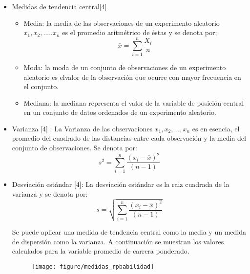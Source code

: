 \begin{itemize}
   
   \item Medidas de tendencia central[4] 
	   \begin{itemize}
		 	\item Media: la media de las observaciones de un experimento aleatorio $x_{1},x_{2},.....x_{n}$ es el promedio aritm\'etrico de \'estas y se denota por;
		 	$$\overline{x}=\sum_{i=1}^{n} \frac{X_{i}}{n}$$ 
		 	\item Moda: la moda de un conjunto de observaciones de un experimento aleatorio es elvalor de la observaci\'on que ocurre con mayor frecuencia en el conjunto.
		 	\item Mediana: la mediana representa el valor de la variable de posición central en un conjunto de datos ordenados de un experimento aleatorio.
		 \end{itemize}
		 
		 
		 \item Varianza [4] : La Varianza de las observaciones $x_{1},x_{2},...,x_{n}$ es en esencia, el promedio del cuadrado de las distancias entre cada observaci\'on y la media del conjunto de observaciones. Se denota por:
		 $$s^{2}=\sum_{i=1}^{n} \frac{ \left( x_{i}-\overline{x}\right)^{2}}{\left(n-1 \right) } $$ 
		 
		 
		 \item Desviación estándar [4]: La desviaci\'on est\'andar es la raiz cuadrada de la varianza y se denota por:
		 $$s=\sqrt{\sum_{i=1}^{n} \frac{ \left( x_{i}-\overline{x}\right)^{2}}{\left(n-1 \right) } }$$ 
		 
		 
		 
		 Se puede aplicar una medida de tendencia central como la media y un medida de dispersión  como la varianza. A continuación se muestran los valores calculados para la variable promedio de carrera ponderado.
		 \begin{figure}[ht]
			\centering
			\texttt{[image: figure/medidas\_rpbabilidad]}
			\caption{}
			\label{fig:medidas_rpbabilidad}
		\end{figure}

 
\end{itemize}  



